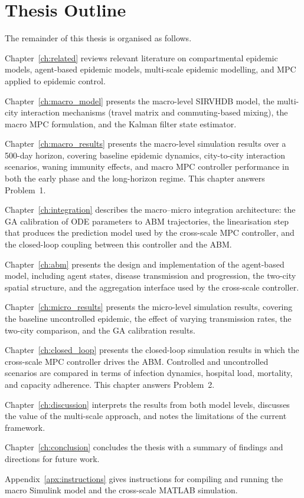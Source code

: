 \section{Thesis Outline}
\label{sec:outline}

The remainder of this thesis is organised as follows.

Chapter~\ref{ch:related} reviews relevant literature on compartmental epidemic models, agent-based epidemic models, multi-scale epidemic modelling, and MPC applied to epidemic control.

Chapter~\ref{ch:macro_model} presents the macro-level SIRVHDB model, the multi-city interaction mechanisms (travel matrix and commuting-based mixing), the macro MPC formulation, and the Kalman filter state estimator.

Chapter~\ref{ch:macro_results} presents the macro-level simulation results over a 500-day horizon, covering baseline epidemic dynamics, city-to-city interaction scenarios, waning immunity effects, and macro MPC controller performance in both the early phase and the long-horizon regime.
This chapter answers Problem~1.

Chapter~\ref{ch:integration} describes the macro--micro integration architecture: the GA calibration of ODE parameters to ABM trajectories, the linearisation step that produces the prediction model used by the cross-scale MPC controller, and the closed-loop coupling between this controller and the ABM.

Chapter~\ref{ch:abm} presents the design and implementation of the agent-based model, including agent states, disease transmission and progression, the two-city spatial structure, and the aggregation interface used by the cross-scale controller.

Chapter~\ref{ch:micro_results} presents the micro-level simulation results, covering the baseline uncontrolled epidemic, the effect of varying transmission rates, the two-city comparison, and the GA calibration results.

Chapter~\ref{ch:closed_loop} presents the closed-loop simulation results in which the cross-scale MPC controller drives the ABM.
Controlled and uncontrolled scenarios are compared in terms of infection dynamics, hospital load, mortality, and capacity adherence.
This chapter answers Problem~2.

Chapter~\ref{ch:discussion} interprets the results from both model levels, discusses the value of the multi-scale approach, and notes the limitations of the current framework.

Chapter~\ref{ch:conclusion} concludes the thesis with a summary of findings and directions for future work.

Appendix~\ref{apx:instructions} gives instructions for compiling and running the macro Simulink model and the cross-scale MATLAB simulation.